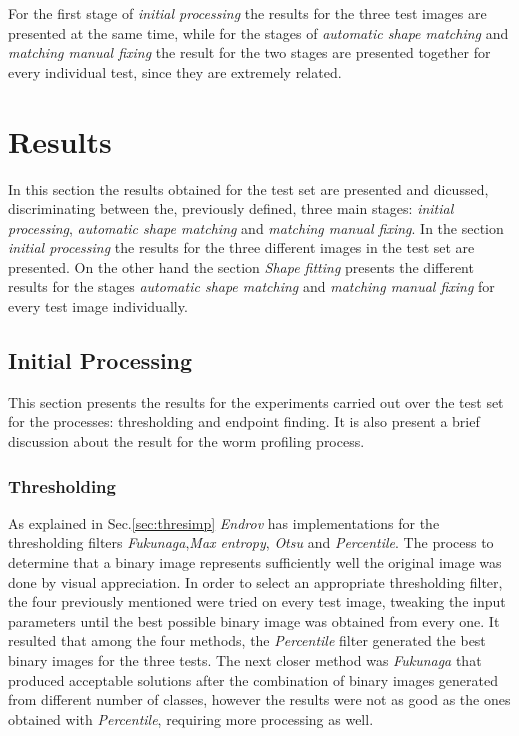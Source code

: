 For the first stage of \emph{initial processing} the results for the three test images are presented
at the same time, while for the stages of \emph{automatic shape matching} and \emph{matching manual fixing}
the result for the two stages are presented together for every individual test, since they are 
extremely related.


\section{Results}
\label{sec:results}

In this section the results obtained for the test set are presented and dicussed, discriminating between
the, previously defined, three main stages: \emph{initial processing}, \emph{automatic shape matching} and
\emph{matching manual fixing}. In the section \emph{initial processing} the results for the three different 
images in the test set are presented. On the other hand the section \emph{Shape fitting} presents the different
results for the stages \emph{automatic shape matching} and \emph{matching manual fixing} for every test image
individually.

\subsection{Initial Processing}
\label{sec:initproc}

This section presents the results for the experiments carried out over the test set for the 
processes: thresholding and endpoint finding. It is also present a brief discussion about
the result for the worm profiling process.

\subsubsection*{Thresholding}

As explained in Sec.\ref{sec:thresimp} \emph{Endrov} has implementations for the 
thresholding filters \emph{Fukunaga},\emph{Max entropy}, \emph{Otsu} and \emph{Percentile}.
The process to determine that a binary image represents sufficiently well the original 
image was done by visual appreciation. In order to select an appropriate thresholding
filter, the four previously mentioned were tried on every test image, tweaking the
input parameters until the best possible binary image was obtained from every one.
It resulted that among the four methods, the \emph{Percentile} filter generated the
best binary images for the three tests. The next closer method was \emph{Fukunaga}
that produced acceptable solutions after the combination of binary images
generated from different number of classes, however the results were not as good as
the ones obtained with \emph{Percentile}, requiring more processing as well.\\

